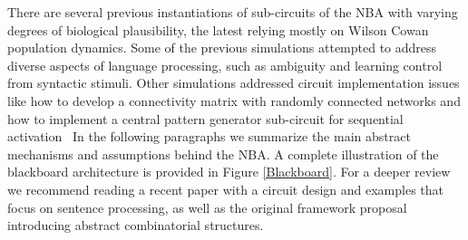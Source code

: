 \documentclass[10pt]{article}
\begin{document}
There are several previous instantiations of sub-circuits of the NBA with varying degrees of biological plausibility, 
the latest relying mostly on Wilson Cowan population dynamics\cite{Destexhe_2009}.
Some of the previous simulations attempted to address diverse aspects of language processing, 
such as ambiguity\cite{Frank_2014} and learning control from syntactic stimuli\cite{van_der_Velde_2010}.
Other simulations addressed circuit implementation issues like how to develop a connectivity matrix with randomly 
connected networks\cite{van_der_Velde_2011} and how to implement a central pattern generator sub-circuit for sequential activation~\cite{van_Dijk_2015}
In the following paragraphs we summarize the main abstract mechanisms and assumptions behind the NBA. A 
complete illustration of the blackboard architecture is provided in Figure {\ref{Blackboard}}.
For a deeper review we recommend reading a recent paper with a circuit design and examples that focus on sentence processing\cite{de2016combinatorial}, as well as the 
original framework proposal introducing abstract combinatorial structures\cite{van_der_Velde_2006}.
\end{document}
